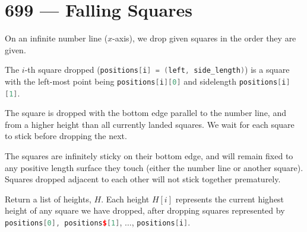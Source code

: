 \section{699 --- Falling Squares}
On an infinite number line ($x$-axis), we drop given squares in the order they are given.

The $i$-th square dropped (\lstinline[language=C++, basicstyle=\small\ttfamily, keywordstyle=\bfseries\color{green!40!black}]|positions[i] = (left, side_length)|) is a square with the left-most point being \lstinline[language=C++, basicstyle=\small\ttfamily, keywordstyle=\bfseries\color{green!40!black}]|positions[i][0]| and sidelength \lstinline[language=C++, basicstyle=\small\ttfamily, keywordstyle=\bfseries\color{green!40!black}]|positions[i][1]|.

The square is dropped with the bottom edge parallel to the number line, and from a higher height than all currently landed squares. We wait for each square to stick before dropping the next.

The squares are infinitely sticky on their bottom edge, and will remain fixed to any positive length surface they touch (either the number line or another square). Squares dropped adjacent to each other will not stick together prematurely.

Return a list of heights, $H$. Each height $H[i]$ represents the current highest height of any square we have dropped, after dropping squares represented by \lstinline[language=C++, basicstyle=\small\ttfamily, keywordstyle=\bfseries\color{green!40!black}]|positions[0], positions$[1]|, $\ldots$, \lstinline[language=C++, basicstyle=\small\ttfamily, keywordstyle=\bfseries\color{green!40!black}]|positions[i]|.


